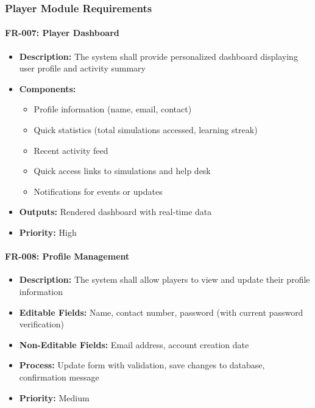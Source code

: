 \documentclass[12pt,a4paper]{article}
\begin{document}
\begin{enumerate}
\subsubsection{Player Module Requirements}

\paragraph{FR-007: Player Dashboard}
\begin{itemize}
    \item \textbf{Description:} The system shall provide personalized dashboard displaying user profile and activity summary
    \item \textbf{Components:}
    \begin{itemize}
        \item Profile information (name, email, contact)
        \item Quick statistics (total simulations accessed, learning streak)
        \item Recent activity feed
        \item Quick access links to simulations and help desk
        \item Notifications for events or updates
    \end{itemize}
    \item \textbf{Outputs:} Rendered dashboard with real-time data
    \item \textbf{Priority:} High
\end{itemize}

\paragraph{FR-008: Profile Management}
\begin{itemize}
    \item \textbf{Description:} The system shall allow players to view and update their profile information
    \item \textbf{Editable Fields:} Name, contact number, password (with current password verification)
    \item \textbf{Non-Editable Fields:} Email address, account creation date
    \item \textbf{Process:} Update form with validation, save changes to database, confirmation message
    \item \textbf{Priority:} Medium
\end{itemize}


\end{enumerate}
\end{document}
